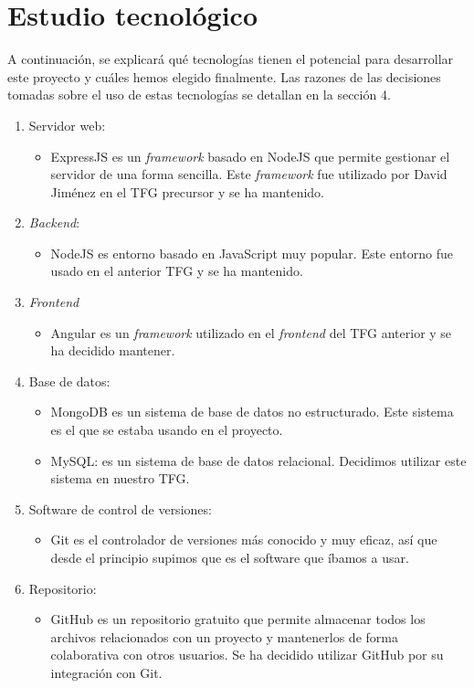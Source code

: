 \documentclass[11pt]{book}
\begin{document}
\section{Estudio tecnológico}
 A continuación, se explicará qué tecnologías tienen el potencial para desarrollar este proyecto y cuáles hemos elegido finalmente. Las razones de las decisiones tomadas sobre el uso de estas tecnologías se detallan en la sección 4.
\begin{enumerate} 
	\item Servidor web:
	\begin{itemize} 
		\item ExpressJS es un \textit{framework} basado en NodeJS que permite gestionar el servidor de una forma sencilla. Este \textit{framework} fue utilizado por David Jiménez en el TFG precursor y se ha mantenido.
	\end{itemize}
	\item \emph{Backend}: 
	\begin{itemize} 
		\item NodeJS es entorno basado en JavaScript muy popular. Este entorno fue usado en el anterior TFG y se ha mantenido.
	\end{itemize}
	\item \emph{Frontend}
	\begin{itemize} 
		\item Angular es un \textit{framework} utilizado en el \textit{frontend} del TFG anterior y se ha decidido mantener.
	\end{itemize}
	\item Base de datos: 
	\begin{itemize} 
		\item MongoDB es un sistema de base de datos no estructurado. Este sistema es el que se estaba usando en el proyecto.
		\item MySQL: es un sistema de base de datos relacional. Decidimos utilizar este sistema en nuestro TFG.
	\end{itemize}
	\item Software de control de versiones:
	\begin{itemize} 
		\item Git es el controlador de versiones más conocido y muy eficaz, así que desde el principio supimos que es el software que íbamos a usar. 
	\end{itemize}
	\item Repositorio: 
	\begin{itemize} 
		\item GitHub es un repositorio gratuito que permite almacenar todos los archivos relacionados con un proyecto y mantenerlos de forma colaborativa con otros usuarios. Se ha decidido utilizar GitHub por su integración con Git.

\end{itemize}
\end{enumerate}
\end{document}

